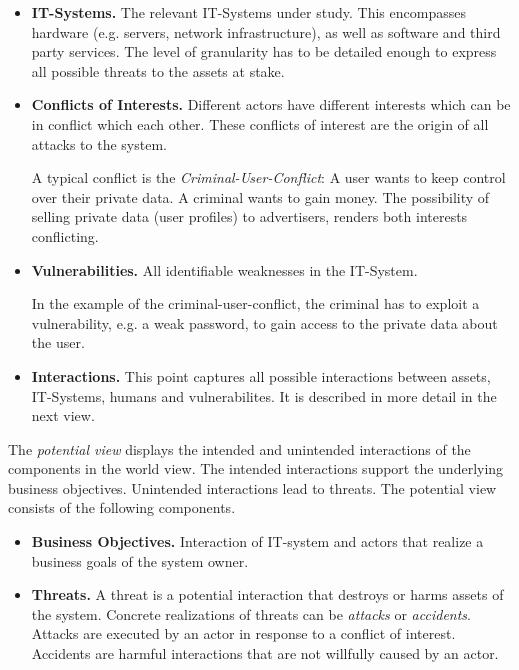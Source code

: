 \documentclass[runningheads,a4paper]{llncs}
\newenvironment{LGContent}
{ \par\color{blue} \it \small }
{ \par }
\begin{document}
\begin{LGContent}
\begin{itemize}
\item \textbf{IT-Systems.}
The relevant IT-Systems under study. This encompasses hardware (e.g. servers, network infrastructure), as well as software and third party services.
The level of granularity has to be detailed enough to express all possible threats to the assets at stake.

\item \textbf{Conflicts of Interests.}
Different actors have different interests which can be in conflict which each other.
These conflicts of interest are the origin of all attacks to the system.

A typical conflict is the \emph{Criminal-User-Conflict}:
A user wants to keep control over their private data.
A criminal wants to gain money.
The possibility of selling private data (user profiles) to advertisers, renders both interests conflicting.

\item \textbf{Vulnerabilities.}
All identifiable weaknesses in the IT-System.

In the example of the criminal-user-conflict, the criminal has to exploit a vulnerability, e.g. a weak password, to gain access to the private data about the user.

\item \textbf{Interactions.}
This point captures all possible interactions between assets, IT-Systems, humans and vulnerabilites.
It is described in more detail in the next view.
\end{itemize}




The \emph{potential view} displays the intended and unintended interactions of the components in the world view.
The intended interactions support the underlying business objectives.
Unintended interactions lead to threats.
The potential view consists of the following components.
\begin{itemize}
\item \textbf{Business Objectives.}
Interaction of IT-system and actors that realize a business goals of the system owner.

\item \textbf{Threats.}
A threat is a potential interaction that destroys or harms assets of the system.
Concrete realizations of threats can be \emph{attacks} or \emph{accidents}.
Attacks are executed by an actor in response to a conflict of interest.
Accidents are harmful interactions that are not willfully caused by an actor.


\end{itemize}
\end{LGContent}
\end{document}
